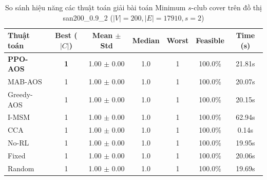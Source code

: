 \begin{table}[htbp]
\centering
\caption{So sánh hiệu năng các thuật toán giải bài toán Minimum $s$-club cover trên đồ thị san200_0.9_2 ($|V|=200, |E|=17910, s=2$)}
\label{tab:results_san200_0_9_2}
\begin{tabular}{lcccccc}
\hline
\textbf{Thuật toán} & \textbf{Best ($|C|$)} & \textbf{Mean $\pm$ Std} & \textbf{Median} & \textbf{Worst} & \textbf{Feasible} & \textbf{Time (s)} \\
\hline
\textbf{PPO-AOS} & \textbf{1} & 1.00 $\pm$ 0.00 & 1.0 & 1 & 100.0\% & 21.81s \\
MAB-AOS & 1 & 1.00 $\pm$ 0.00 & 1.0 & 1 & 100.0\% & 20.07s \\
Greedy-AOS & 1 & 1.00 $\pm$ 0.00 & 1.0 & 1 & 100.0\% & 20.15s \\
I-MSM & 1 & 1.00 $\pm$ 0.00 & 1.0 & 1 & 100.0\% & 62.94s \\
CCA & 1 & 1.00 $\pm$ 0.00 & 1.0 & 1 & 100.0\% & 0.14s \\
No-RL & 1 & 1.00 $\pm$ 0.00 & 1.0 & 1 & 100.0\% & 19.95s \\
Fixed & 1 & 1.00 $\pm$ 0.00 & 1.0 & 1 & 100.0\% & 20.06s \\
Random & 1 & 1.00 $\pm$ 0.00 & 1.0 & 1 & 100.0\% & 19.69s \\
\hline
\end{tabular}
\end{table}
